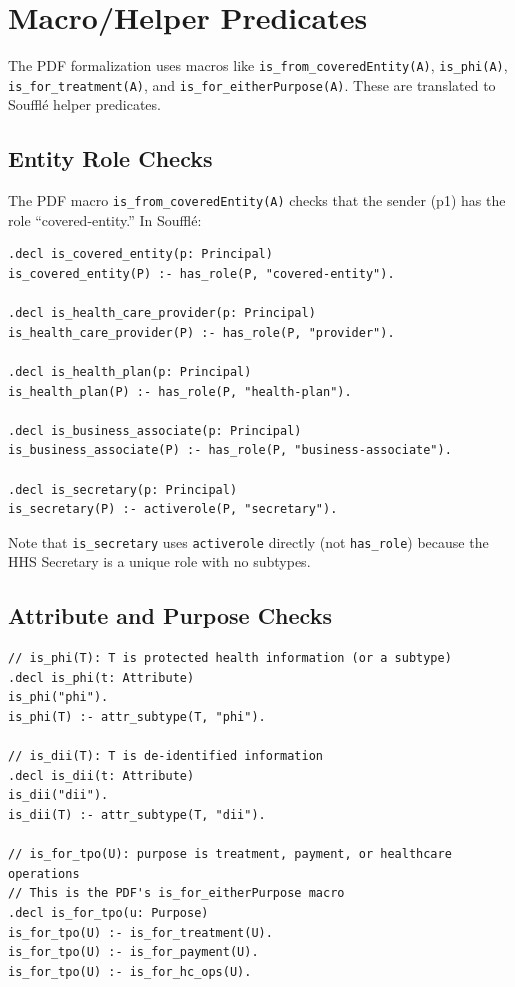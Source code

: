 \documentclass[11pt,letterpaper]{article}
\begin{document}
\section{Macro/Helper Predicates}
\label{sec:macros}

The PDF formalization uses macros like \texttt{is\_from\_coveredEntity(A)}, \texttt{is\_phi(A)}, \texttt{is\_for\_treatment(A)}, and \texttt{is\_for\_eitherPurpose(A)}. These are translated to Souffl\'{e} helper predicates.

\subsection{Entity Role Checks}

The PDF macro \texttt{is\_from\_coveredEntity(A)} checks that the sender (p1) has the role ``covered-entity.'' In Souffl\'{e}:

\begin{lstlisting}[style=soufflestyle,caption={Entity role check predicates}]
.decl is_covered_entity(p: Principal)
is_covered_entity(P) :- has_role(P, "covered-entity").

.decl is_health_care_provider(p: Principal)
is_health_care_provider(P) :- has_role(P, "provider").

.decl is_health_plan(p: Principal)
is_health_plan(P) :- has_role(P, "health-plan").

.decl is_business_associate(p: Principal)
is_business_associate(P) :- has_role(P, "business-associate").

.decl is_secretary(p: Principal)
is_secretary(P) :- activerole(P, "secretary").
\end{lstlisting}

Note that \texttt{is\_secretary} uses \texttt{activerole} directly (not \texttt{has\_role}) because the HHS Secretary is a unique role with no subtypes.

\subsection{Attribute and Purpose Checks}

\begin{lstlisting}[style=soufflestyle,caption={Attribute and purpose check predicates}]
// is_phi(T): T is protected health information (or a subtype)
.decl is_phi(t: Attribute)
is_phi("phi").
is_phi(T) :- attr_subtype(T, "phi").

// is_dii(T): T is de-identified information
.decl is_dii(t: Attribute)
is_dii("dii").
is_dii(T) :- attr_subtype(T, "dii").

// is_for_tpo(U): purpose is treatment, payment, or healthcare operations
// This is the PDF's is_for_eitherPurpose macro
.decl is_for_tpo(u: Purpose)
is_for_tpo(U) :- is_for_treatment(U).
is_for_tpo(U) :- is_for_payment(U).
is_for_tpo(U) :- is_for_hc_ops(U).
\end{lstlisting}
\end{document}
